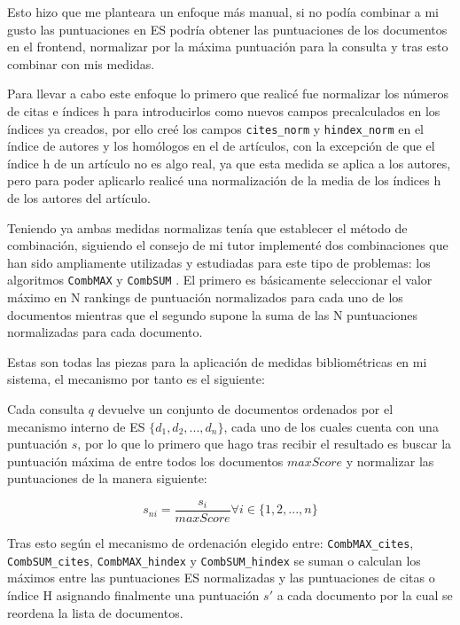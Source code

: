 Esto hizo que me planteara un enfoque más manual, si no podía combinar a mi gusto las puntuaciones en \acrshort{ES} podría obtener las puntuaciones de los documentos en el \gls{frontend}, normalizar por la máxima puntuación para la consulta y tras esto combinar con mis medidas. 

Para llevar a cabo este enfoque lo primero que realicé fue normalizar los números de citas e índices h para introducirlos como nuevos campos precalculados en los índices ya creados, por ello creé los campos \texttt{cites\_norm} y \texttt{hindex\_norm} en el índice de autores y los homólogos en el de artículos, con la excepción de que el índice h de un artículo no es algo real, ya que esta medida se aplica a los autores, pero para poder aplicarlo realicé una normalización de la media de los índices h de los autores del artículo.

Teniendo ya ambas medidas normalizas tenía que establecer el método de combinación, siguiendo el consejo de mi tutor implementé dos combinaciones que han sido ampliamente utilizadas y estudiadas para este tipo de problemas: los algoritmos \texttt{CombMAX} y \texttt{CombSUM} \cite{DBLP:conf/trec/ShawF94}. El primero es básicamente seleccionar el valor máximo en N rankings de puntuación normalizados para cada uno de los documentos mientras que el segundo supone la suma de las N puntuaciones normalizadas para cada documento. 

Estas son todas las piezas para la aplicación de medidas bibliométricas en mi sistema, el mecanismo por tanto es el siguiente:

Cada consulta $q$ devuelve un conjunto de documentos ordenados por el mecanismo interno de \acrshort{ES} $\{d_1, d_2, ..., d_n\}$, cada uno de los cuales cuenta con una puntuación $s$, por lo que lo primero que hago tras recibir el resultado es buscar la puntuación máxima de entre todos los documentos $maxScore$ y normalizar las puntuaciones de la manera siguiente:

\begin{equation}
s_{ni} = \frac{s_i}{maxScore} \forall i \in \{1, 2, ..., n\}
\end{equation}

Tras esto según el mecanismo de ordenación elegido entre: \texttt{CombMAX\_cites}, \texttt{CombSUM\_cites}, \texttt{CombMAX\_hindex} y \texttt{CombSUM\_hindex} se suman o calculan los máximos entre las puntuaciones \acrshort{ES} normalizadas y las puntuaciones de citas o índice H asignando finalmente una puntuación $s'$ a cada documento por la cual se reordena la lista de documentos.

